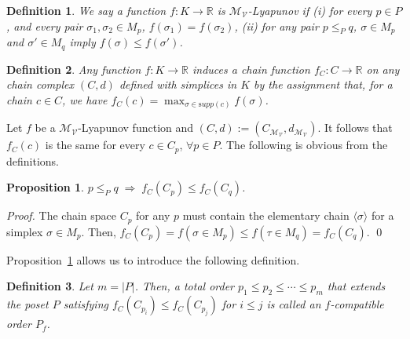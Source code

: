 \documentclass[a4paper,english,cleveref]{article}
\theoremstyle{plain}
\newtheorem{prop}{Proposition}[section]
\newtheorem{definition}{Definition}[section]
\def\implies{\;\Rightarrow\;}
\newcounter{li}
\newcommand{\mv}{\mathcal{V}}
\newcommand{\md}{\mathcal{M}}
\begin{document}
\begin{definition}
    We say a function $f: K\rightarrow \mathbb{R}$ is $\md_\mv$-Lyapunov if (i) for every $p\in P$,
    and every pair $\sigma_1,\sigma_2\in M_p$, $f(\sigma_1)=f(\sigma_2)$, (ii) for any pair 
    $p \leq_{P} q$, $\sigma\in M_p$ and $\sigma'\in M_q$ imply $f(\sigma)\leq f(\sigma')$.
\end{definition}
\begin{definition}
Any function $f:K\rightarrow \mathbb{R}$ induces a \emph{chain function} $f_C: C\rightarrow \mathbb{R}$
on any chain complex $(C,d)$ defined with simplices in $K$ by the assignment that,
for a chain $c\in C$, we have
$f_C(c)=\max_{\sigma\in {\mathrm supp}(c)} f(\sigma)$. 
\label{def:chainf}
\end{definition}
Let $f$ be a
$\md_\mv$-Lyapunov function and $(C,d):=(C_{\md_\mv},d_{\md_\mv})$. It follows
that $f_C(c)$ is the same for every $c\in C_p$, $\forall p\in P$.
The following is obvious from the definitions.
\begin{prop}
$p\leq_{P} q \implies f_C(C_p) \leq f_C(C_q)$.
\label{prop:inducedf}
\end{prop}
\begin{proof}
    The chain space $C_p$ for any $p$ must contain the elementary chain
    $\langle \sigma\rangle$ for a simplex $\sigma \in M_p$. Then, 
    $f_C(C_p)=f(\sigma\in M_p)\leq f(\tau\in M_q)=f_C(C_q)$.
    \qed
\end{proof}
Proposition~\ref{prop:inducedf} allows us to introduce the following definition.
\begin{definition}
Let $m=|P|$. Then, a total order
$p_1\leq p_2\leq \cdots\leq p_m$ that
extends the poset $P$
satisfying  
$f_C(C_{p_i})\leq f_C(C_{p_j})$ for $i\leq j$ is called an $f$-compatible
order $P_f$.
\end{definition}
\end{document}
